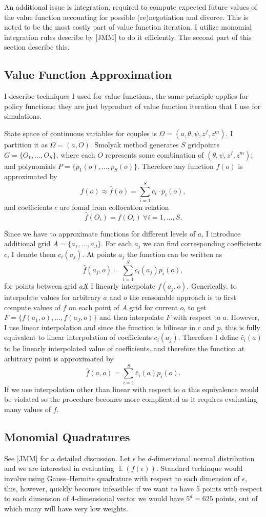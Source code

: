 \documentclass[12pt,letter]{article}
\DeclareMathOperator{\E}{\mathbb{E}}
\begin{document}
An additional issue is integration, required to compute expected future values of the value function accounting for possible (re)negotiation and divorce. This is noted to be the most costly part of value function iteration. I utilize monomial integration rules describe by [JMM] to do it efficiently. The second part of this section describe this. 

\subsection{Value Function Approximation}
I describe techniques I used for value functions, the same principle applies for policy functions: they are just byproduct of value function iteration that I use for simulations.

State space of continuous variables for couples is $\Omega = (a,\theta,\psi,z^f,z^m)$. I partition it as $\Omega = (a,O)$. Smolyak method generates $S$ gridpoints $G = \{O_1,...,O_S\}$, where each $O$ represents some combination of $(\theta,\psi,z^f,z^m)$; and polynomials $P = \{p_1(o),...,p_S(o)\}$. Therefore any function $f(o)$ is approximated by
\[f(o) \approx \hat{f}(o) = \sum_{i=1}^S c_{i}\cdot p_i(o),\]
and coefficients $c$ are found from collocation relation
\[\hat{f}(O_i) = f(O_i) \ \forall i = 1,...,S.\]

Since we have to approximate functions for different levels of $a$, I introduce additional grid $A = \{a_1,...,a_J\}$. For each $a_j$ we can find corresponding coefficients $c$, I denote them $c_i(a_j)$. At points $a_j$ the function can be written as
\[\hat{f}(a_j,o) = \sum\limits_{i=1}^S c_i(a_j) p_i(o),\]
for points between grid $a \not A$ I linearly interpolate $f(a_j,o)$. Generically, to interpolate values for arbitrary $a$ and $o$ the  reasonable approach is to first compute values of $f$ on each point of $A$ grid for current $o$, to get $F = \{f(a_1,o),...,f(a_J,o)\}$ and then interpolate $F$ with respect to $a$. However, I use linear interpolation and since the function is bilinear in $c$ and $p$, this is fully equivalent to linear interpolation of coefficients $c_i(a_j)$. Therefore I define $\hat{c}_i(a)$ to be linearly interpolated value of coefficients, and therefore the function at arbitrary point is approximated by
\[\hat{f}(a,o) = \sum\limits_{i=1}^S \bar{c}_i(a) p_i(o).\]
If we use interpolation other than linear with respect to $a$ this equivalence would be violated so the procedure becomes more complicated as it requires evaluating many values of $f$.

\subsection{Monomial Quadratures}
See [JMM] for a detailed discussion. Let $\epsilon$ be $d$-dimensional normal distribution and we are interested in evaluating $\E(f(\epsilon))$. Standard techinque would involve using Gauss--Hermite quadrature with respect to each dimension of $\epsilon$, this, however, quickly becomes infeasible: if we want to have 5 points with respect to each dimension of 4-dimensional vector we would have $5^d = 625$ points, out of which many will have very low weights. 
\end{document}
